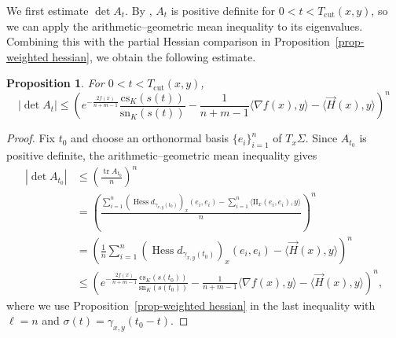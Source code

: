 \documentclass[psamsfonts]{amsart}
\newtheorem{prop}[thm]{Proposition}
\theoremstyle{definition}
\theoremstyle{remark}
\numberwithin{equation}{section}
\begin{document}
We first estimate $\operatorname{det} A_t$. By \cite[Lemma 3.4 (i)]{Pan-Yi2026}, $A_t$ is positive definite for $0<t<T_{\mathrm{cut}}(x,y)$, so we can apply the arithmetic--geometric mean inequality to its eigenvalues. Combining this with the partial Hessian comparison in Proposition~\ref{prop-weighted hessian}, we obtain the following estimate.
\begin{prop}\label{proposition At estimate}
For $0<t<T_{\mathrm{cut}}(x,y)$,
    $$|\operatorname{det} A_t| \leq \left(e^{-\frac{2f(x)}{n+m-1}} \frac{\mathrm{cs}_K(s(t))}{\mathrm{sn}_K(s(t))} - \frac{1}{n+m-1}\langle \nabla f (x), y \rangle - \langle \vec H(x) , y \rangle \right)^n  $$
\end{prop}
\begin{proof}
Fix $t_0$ and choose an orthonormal basis $\{e_i \}_{i=1}^n$ of $T_x \Sigma$.
Since $A_{t_0}$ is positive definite, the arithmetic--geometric mean inequality gives
\begin{align*}
    |\operatorname{det} A_{t_0} | 
    &\leq \left( \frac{\operatorname{tr}A_{t_0}}{n}\right)^n\\
    & = \left( \frac{\sum_{i=1}^n \left(\operatorname{Hess} d_{\gamma_{x,y}(t_0)}\right)_x (e_i , e_i) - \sum_{i=1}^n \langle \mathrm{II}_x (e_i, e_i) , y \rangle}{n}\right)^n\\
    & = \left( \frac{1}{n} \sum_{i=1}^n \left(\operatorname{Hess} d_{\gamma_{x,y}(t_0)}\right)_x (e_i , e_i) - \langle \vec H(x), y\rangle \right)^n\\
    & \leq\left(e^{-\frac{2f(x)}{n+m-1}} \frac{\mathrm{cs}_K(s(t_0))}{\mathrm{sn}_K(s(t_0))} - \frac{1}{n+m-1}\langle \nabla f(x), y \rangle - \langle \vec H(x) , y\rangle \right)^n,
\end{align*}
where we use Proposition~\ref{prop-weighted hessian} in the last inequality with $\ell = n$ and $\sigma (t) = \gamma_{x,y}(t_0 - t)$.
\end{proof}
\end{document}
